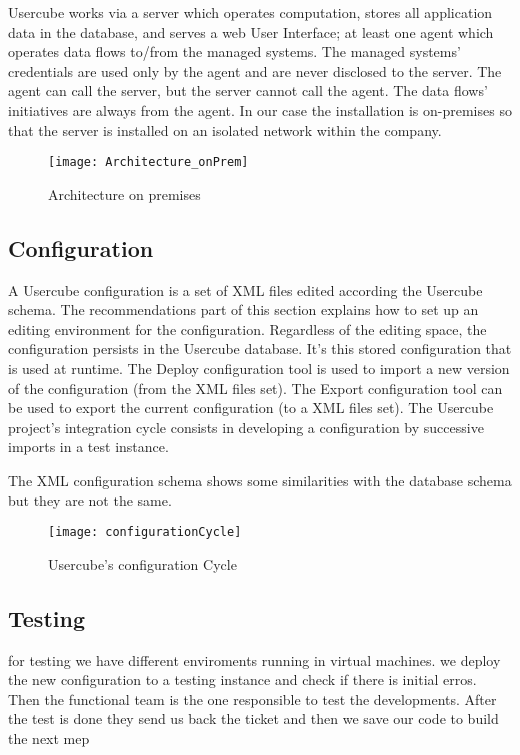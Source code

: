 Usercube works via a server which operates computation, stores all application data in the database, and serves a web User Interface; at least one agent which operates data flows to/from the managed systems. The managed systems' credentials are used only by the agent and are never disclosed to the server. The agent can call the server, but the server cannot call the agent. The data flows' initiatives are always from the agent. In our case the installation is on-premises so that the server is installed on an isolated network within the company.

\begin{figure}[htbp]
  \centering
  \texttt{[image: Architecture\_onPrem]}
  \caption{Architecture on premises}
  \label{fig:Architecture_onPrem}
\end{figure}

\subsection{Configuration}
\label{sec:Template}

A Usercube configuration is a set of XML files edited according the Usercube schema. The recommendations part of this section explains how to set up an editing environment for the configuration. Regardless of the editing space, the configuration persists in the Usercube database. It's this stored configuration that is used at runtime. The Deploy configuration tool is used to import a new version of the configuration (from the XML files set). The Export configuration tool can be used to export the current configuration (to a XML files set). The Usercube project's integration cycle consists in developing a configuration by successive imports in a test instance.

The XML configuration schema shows some similarities with the database schema but they are not the same.

\begin{figure}[htbp]
  \centering
  \texttt{[image: configurationCycle]}
  \caption{Usercube's configuration Cycle}
  \label{fig:configurationCycle}
\end{figure}

\subsection{Testing}
\label{sec:Template}

for testing we have different enviroments running in virtual machines. we deploy the new configuration to a testing instance and check if there is initial erros. Then the functional team is the one responsible to test the developments. After the test is done they send us back the ticket and then we save our code to build the next mep

